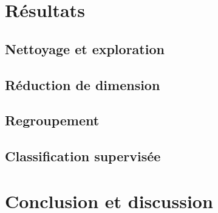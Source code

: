 \documentclass[12pt]{article}
\begin{document}
\section{Résultats}
 
 
\subsection{Nettoyage et exploration}
 
 
\subsection{Réduction de dimension}
 
 
\subsection{Regroupement}
 
 
\subsection{Classification supervisée}
 
 
 
\section{Conclusion et discussion}
 
 
 
\end{document}
